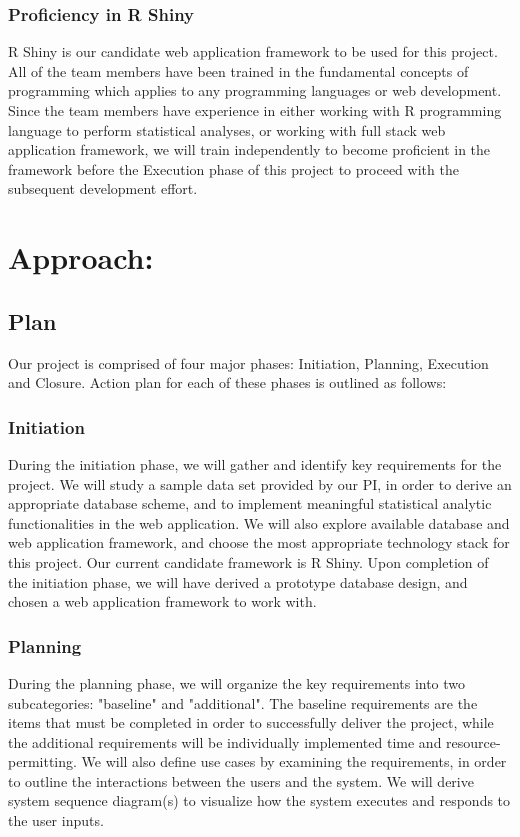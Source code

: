 \documentclass[10pt,twocolumn,letterpaper]{article}
\begin{document}
            \subsubsection{Proficiency in R Shiny}
            R Shiny is our candidate web application framework to be used for this project. 
            All of the team members have been trained in the fundamental concepts of programming which applies to any programming languages or web development. 
            Since the team members have experience in either working with R programming language to perform statistical analyses, or working with full stack web application framework, we will train independently to become proficient in the framework before the Execution phase of this project to proceed with the subsequent development effort.
	   	\section{Approach:}

            \subsection{Plan}
            Our project is comprised of four major phases: Initiation, Planning, Execution and Closure. Action plan for each of these phases is outlined as follows:
                \subsubsection{Initiation}
                During the initiation phase, we will gather and identify key requirements for the project. 
                We will study a sample data set provided by our PI, in order to derive an appropriate database scheme, and to implement meaningful statistical analytic functionalities in the web application. 
                We will also explore available database and web application framework, and choose the most appropriate technology stack for this project. Our current candidate framework is R Shiny.
                Upon completion of the initiation phase, we will have derived a prototype database design, and chosen a web application framework to work with.
                \subsubsection{Planning}
                During the planning phase, we will organize the key requirements into two subcategories: "baseline" and "additional". 
                The baseline requirements are the items that must be completed in order to successfully deliver the project, while the additional requirements will be individually implemented time and resource-permitting. 
                We will also define use cases by examining the requirements, in order to outline the interactions between the users and the system. We will derive system sequence diagram(s) to visualize how the system executes and responds to the user inputs.
\end{document}
